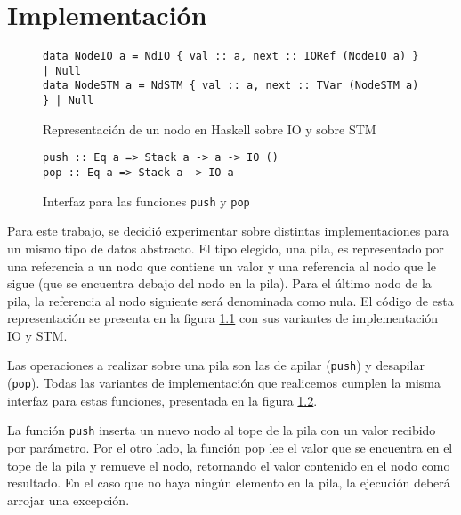 \chapter{Implementación}\label{ch:implementacion}

\begin{figure}[t]
  \centering
  \begin{verbatim}
data NodeIO a = NdIO { val :: a, next :: IORef (NodeIO a) } | Null
data NodeSTM a = NdSTM { val :: a, next :: TVar (NodeSTM a) } | Null
  \end{verbatim}
  \caption{Representación de un nodo en Haskell sobre IO y sobre STM}
  \label{fig:node-rep}
\end{figure}

\begin{figure}[t]
  \centering
  \begin{verbatim}
push :: Eq a => Stack a -> a -> IO ()
pop :: Eq a => Stack a -> IO a
  \end{verbatim}
  \caption{Interfaz para las funciones \texttt{push} y \texttt{pop}}
  \label{fig:interfazStack}
\end{figure}

Para este trabajo, se decidió experimentar sobre distintas implementaciones para un mismo tipo de datos abstracto.
El tipo elegido, una pila, es representado por una referencia a un nodo que contiene un valor y una referencia al nodo que le sigue (que se encuentra debajo del nodo en la pila).
Para el último nodo de la pila, la referencia al nodo siguiente será denominada como nula.
El código de esta representación se presenta en la figura \ref{fig:node-rep} con sus variantes de implementación IO y STM.

Las operaciones a realizar sobre una pila son las de apilar (\texttt{push}) y desapilar (\texttt{pop}).
Todas las variantes de implementación que realicemos cumplen la misma interfaz para estas funciones, presentada en la figura \ref{fig:interfazStack}.

La función \texttt{push} inserta un nuevo nodo al tope de la pila con un valor recibido por parámetro. Por el otro lado, la función pop lee el valor que se encuentra en el tope de la pila y remueve el nodo, retornando el valor contenido en el nodo como resultado. En el caso que no haya ningún elemento en la pila, la ejecución deberá arrojar una excepción.

